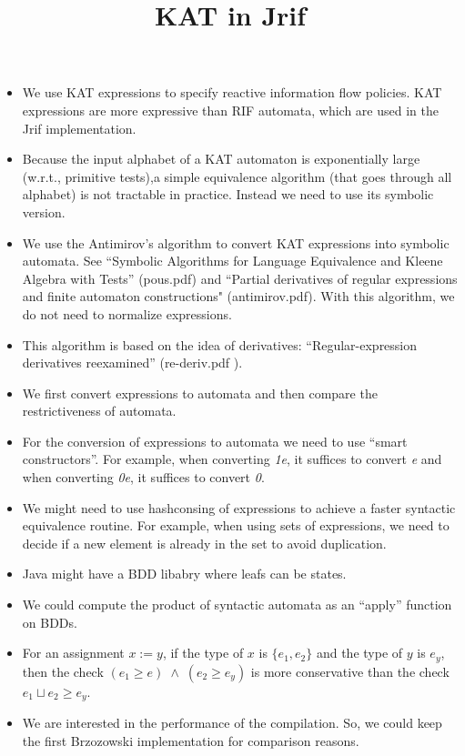 \documentclass[10pt]{article}
\title{KAT in Jrif}
\begin{document}
\maketitle
\begin{itemize}
\item We use KAT expressions to specify reactive information flow policies. KAT expressions are more expressive than RIF automata, which are used in the Jrif implementation.
\item Because the input alphabet of a KAT automaton is exponentially large (w.r.t., primitive tests),a simple equivalence algorithm (that goes through all alphabet) is not tractable in practice. Instead we need to use its symbolic version.
\item We use the Antimirov's algorithm to convert KAT expressions into symbolic automata. See ``Symbolic Algorithms for Language Equivalence and Kleene Algebra with Tests'' (pous.pdf) and ``Partial derivatives of regular expressions and finite automaton constructions" (antimirov.pdf). With this algorithm, we do not need to normalize expressions.
\item This algorithm is based on the idea of derivatives: ``Regular-expression derivatives reexamined'' (re-deriv.pdf
).
\item We first convert expressions to automata and then compare the restrictiveness of automata.
\item For the conversion of expressions to automata we need to use ``smart constructors''. For example, when converting \emph{1e}, it suffices to convert \emph{e} and when converting \emph{0e}, it suffices to convert \emph{0}.
\item We might need to use hashconsing of expressions to achieve a faster syntactic equivalence routine. For example, when using sets of expressions, we need to decide if a new element is already in the set to avoid duplication.
\item Java might have a BDD libabry where leafs can be states.
\item We could compute the product of syntactic automata as an ``apply'' function on BDDs.
\item For an assignment $x:=y$, if the type of $x$ is $\{e_1,e_2\}$ and the type of $y$ is $e_y$, then the check $(e_1\geq e)\;\wedge\;(e_2\geq e_y)$ is more conservative than the check $e_1\sqcup e_2\geq e_y$.
\item We are interested in the performance of the compilation. So, we could keep the first Brzozowski implementation for comparison reasons.
\end{itemize}
\end{document}
